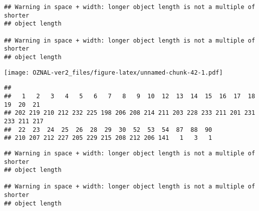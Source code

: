 \documentclass[
]{article}
\newenvironment{Shaded}{\begin{snugshade}}{\end{snugshade}}
\newcommand{\AttributeTok}[1]{\textcolor[rgb]{0.77,0.63,0.00}{#1}}
\newcommand{\ConstantTok}[1]{\textcolor[rgb]{0.00,0.00,0.00}{#1}}
\newcommand{\DecValTok}[1]{\textcolor[rgb]{0.00,0.00,0.81}{#1}}
\newcommand{\FunctionTok}[1]{\textcolor[rgb]{0.00,0.00,0.00}{#1}}
\newcommand{\NormalTok}[1]{#1}
\newcommand{\SpecialCharTok}[1]{\textcolor[rgb]{0.00,0.00,0.00}{#1}}
\newcommand{\StringTok}[1]{\textcolor[rgb]{0.31,0.60,0.02}{#1}}
\begin{document}
\begin{verbatim}
## Warning in space + width: longer object length is not a multiple of shorter
## object length

## Warning in space + width: longer object length is not a multiple of shorter
## object length
\end{verbatim}

\texttt{[image: OZNAL-ver2\_files/figure-latex/unnamed-chunk-42-1.pdf]}

\begin{Shaded}
\end{Shaded}

\begin{verbatim}
## 
##   1   2   3   4   5   6   7   8   9  10  12  13  14  15  16  17  18  19  20  21 
## 202 219 210 212 232 225 198 206 208 214 211 203 228 233 211 201 231 233 211 217 
##  22  23  24  25  26  28  29  30  52  53  54  87  88  90 
## 210 207 212 227 205 229 215 208 212 206 141   1   3   1
\end{verbatim}

\begin{Shaded}
\end{Shaded}

\begin{verbatim}
## Warning in space + width: longer object length is not a multiple of shorter
## object length

## Warning in space + width: longer object length is not a multiple of shorter
## object length
\end{verbatim}
\end{document}
